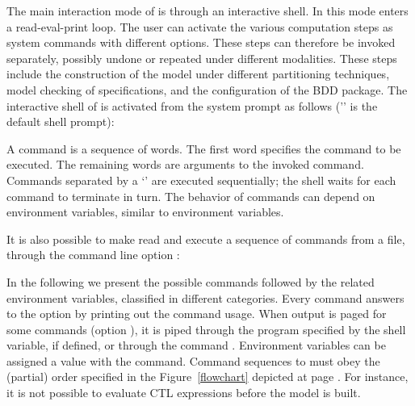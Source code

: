 
The main interaction mode of \nusmv is through an interactive shell.
In this mode \nusmv enters a read-eval-print loop. The user can
activate the various \nusmv computation steps as system commands with
different options. These steps can therefore be invoked separately,
possibly undone or repeated under different modalities. These steps
include the construction of the model under different partitioning
techniques, model checking of specifications, and the configuration of
the BDD package. The interactive shell of \nusmv is activated from the
system prompt as follows ('\nusmvprompt' is the default \nusmv
shell prompt):

\begin{alltt}
\shellprompt {} \ret
\nusmvprompt
\end{alltt}

A \nusmv command is a sequence of words. The first word specifies the
command to be executed. The remaining words are arguments to the
invoked command. Commands separated by a `\code{;}' are executed
sequentially; the \nusmv shell waits for each command to terminate in
turn. The behavior of commands can depend on environment variables,
similar to \csh environment variables.

It is also possible to make \nusmv read and execute a sequence of
commands from a file, through the command line option 
:

\begin{alltt}
\shellprompt {} \ret
\end{alltt}

\begin{nusmvTable}
\end{nusmvTable}

\vspace{5mm}

In the following we present the possible commands followed by the
related environment variables, classified in different
categories. Every command answers to the option  by
printing out the command usage. When output is paged for some commands
(option ), it is piped through the program specified by
the \unix {} shell variable, if defined, or through the
\unix command . Environment variables can be
assigned a value with the  command.  Command
sequences to \nusmv must obey the (partial) order specified in the
Figure~\ref{flowchart} depicted at page \pageref{flowchart}. For
instance, it is not possible to evaluate CTL expressions before the
model is built.

